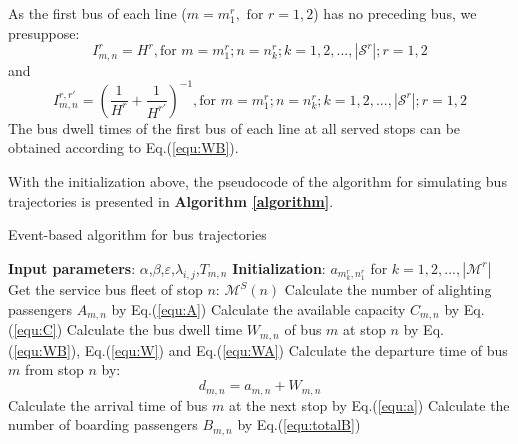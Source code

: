 \documentclass[smallextended]{svjour3}       %
\begin{document}
\begin{Abstract}
As the first bus of each line ($m=m^{r}_{1},\text{ for }r=1,2$) has no preceding bus, we presuppose:
\begin{equation}
    I_{m,n}^{r} = H^{r}, \text{for } m=m^{r}_{1};n=n^{r}_{k};k=1,2,...,\left|\mathcal{S}^{r}\right|;r=1,2
\end{equation}
and
\begin{equation}
    I_{m,n}^{r,r'} = \left(\frac{1}{H^{r}}+\frac{1}{H^{r'}}\right)^{-1}, \text{for } m=m^{r}_{1};n=n^{r}_{k};k=1,2,...,\left|\mathcal{S}^{r}\right|;r=1,2
\end{equation}
The bus dwell times of the first bus of each line at all served stops can be obtained according to Eq.(\ref{equ:WB}).

With the initialization above, the pseudocode of the algorithm for simulating bus trajectories is presented in \textbf{Algorithm \ref{algorithm}}.
\begin{algorithm}[H]
    \caption{Event-based algorithm for bus trajectories}
    \label{algorithm}
    \begin{algorithmic}
        \STATE \textbf{Input parameters}: $\alpha$,$\beta$,$\varepsilon$,$\lambda_{i,j}$,$T_{m,n}$ %
        \STATE \textbf{Initialization}: $a_{m^{r}_{k},n^{r}_{1}}$ for $k=1,2,...,\left| \mathcal{M}^{r} \right|$
              \STATE Get the service bus fleet of stop $n$: $\mathcal{M}^{S}(n)$
                  \STATE Calculate the number of alighting passengers $A_{m,n}$ by Eq.(\ref{equ:A}) 
                  \STATE Calculate the available capacity $C_{m,n}$ by Eq.(\ref{equ:C})
                  \STATE Calculate the bus dwell time $W_{m,n}$ of bus $m$ at stop $n$ by Eq.(\ref{equ:WB}), Eq.(\ref{equ:W}) and Eq.(\ref{equ:WA})
                  \STATE Calculate the departure time of bus $m$ from stop $n$ by:
                  \begin{equation}
                      d_{m,n}=a_{m,n}+W_{m,n}
                  \end{equation}
                  \STATE Calculate the arrival time of bus $m$ at the next stop by Eq.(\ref{equ:a})
                  \STATE Calculate the number of boarding passengers $B_{m,n}$ by Eq.(\ref{equ:totalB})      

\end{algorithmic}
\end{algorithm}
\end{Abstract}
\end{document}
